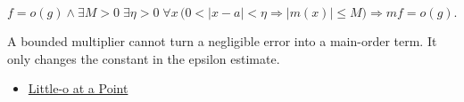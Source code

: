 \begin{remark*}
\[
f=o(g)\land \exists M>0\;\exists\eta>0\;\forall x\,
\bigl(0<|x-a|<\eta\Rightarrow |m(x)|\leq M\bigr)
\Longrightarrow mf=o(g).
\]
\end{remark*}

\begin{remark*}[Interpretation]
A bounded multiplier cannot turn a negligible error into a main-order term. It
only changes the constant in the epsilon estimate.
\end{remark*}

\begin{dependencies}
\begin{itemize}
  \item \hyperref[def:little-o-at-a-point]{Little-o at a Point}
\end{itemize}
\end{dependencies}
